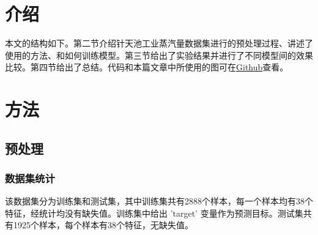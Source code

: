 \documentclass{cjc}
\begin{document}
\maketitle


\section{介绍}
本文的结构如下。第二节介绍针天池工业蒸汽量数据集进行的预处理过程、讲述了使用的方法、和如何训练模型。第三节给出了实验结果并进行了不同模型间的效果比较。第四节给出了总结。代码和本篇文章中所使用的图可在\href{https://github.com/easilylazy/data-science/tree/main/Zhengqi}{Github}查看。


\section{方法}

\subsection{预处理}

\subsubsection{数据集统计}
该数据集分为训练集和测试集，其中训练集共有2888个样本，每一个样本均有38个特征，经统计均没有缺失值。训练集中给出 'target' 变量作为预测目标。测试集共有1925个样本，每个样本有38个特征，无缺失值。
\end{document}

